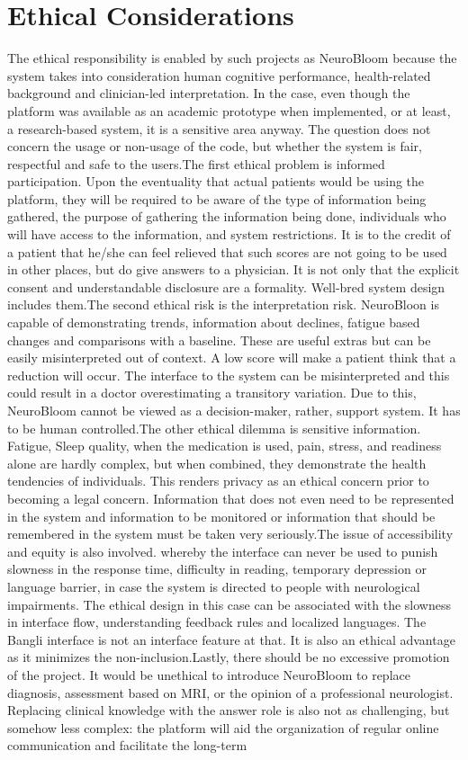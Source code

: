 \documentclass[12pt,a4paper]{report}
\begin{document}
\section{Ethical Considerations}
The ethical responsibility is enabled by such projects as NeuroBloom because the system takes into consideration human cognitive performance, health-related background and clinician-led interpretation. In the case, even though the platform was available as an academic prototype when implemented, or at least, a research-based system, it is a sensitive area anyway. The question does not concern the usage or non-usage of the code, but whether the system is fair, respectful and safe to the users.The first ethical problem is informed participation. Upon the eventuality that actual patients would be using the platform, they will be required to be aware of the type of information being gathered, the purpose of gathering the information being done, individuals who will have access to the information, and system restrictions. It is to the credit of a patient that he/she can feel relieved that such scores are not going to be used in other places, but do give answers to a physician. It is not only that the explicit consent and understandable disclosure are a formality. Well-bred system design includes them.The second ethical risk is the interpretation risk. NeuroBloon is capable of demonstrating trends, information about declines, fatigue based changes and comparisons with a baseline. These are useful extras but can be easily misinterpreted out of context. A low score will make a patient think that a reduction will occur. The interface to the system can be misinterpreted and this could result in a doctor overestimating a transitory variation. Due to this, NeuroBloom cannot be viewed as a decision-maker, rather, support system. It has to be human controlled.The other ethical dilemma is sensitive information. Fatigue, Sleep quality, when the medication is used, pain, stress, and readiness alone are hardly complex, but when combined, they demonstrate the health tendencies of individuals. This renders privacy as an ethical concern prior to becoming a legal concern. Information that does not even need to be represented in the system and information to be monitored or information that should be remembered in the system must be taken very seriously.The issue of accessibility and equity is also involved. whereby the interface can never be used to punish slowness in the response time, difficulty in reading, temporary depression or language barrier, in case the system is directed to people with neurological impairments. The ethical design in this case can be associated with the slowness in interface flow, understanding feedback rules and localized languages. The Bangli interface is not an interface feature at that. It is also an ethical advantage as it minimizes the non-inclusion.Lastly, there should be no excessive promotion of the project. It would be unethical to introduce NeuroBloom to replace diagnosis, assessment based on MRI, or the opinion of a professional neurologist. Replacing clinical knowledge with the answer role is also not as challenging, but somehow less complex: the platform will aid the organization of regular online communication and facilitate the long-term 
\end{document}
